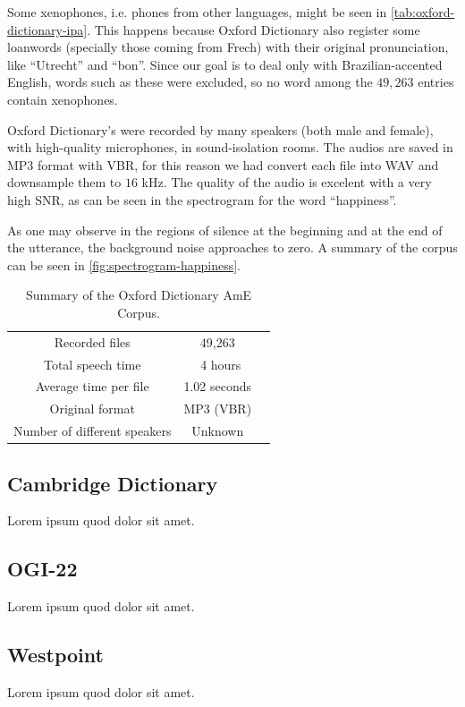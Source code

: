 Some xenophones, i.e. phones from other languages, might be seen in \autoref{tab:oxford-dictionary-ipa}. This happens because
Oxford Dictionary also register some loanwords (specially those coming from Frech) with their original pronunciation,
like ``Utrecht'' and ``bon''. Since our goal is to deal only with Brazilian-accented English, words such as these
were excluded, so no word among the $49,263$ entries contain xenophones.

Oxford Dictionary's were recorded by many speakers (both male and female), with high-quality microphones, in sound-isolation rooms.
The audios are saved in MP3 format with \ac{VBR}, for this reason we had convert each file into WAV and downsample them to $16$ kHz.
The quality of the audio is excelent with a very high \ac{SNR}, as can be seen in the spectrogram for the word ``happiness''.

As one may observe in the regions of silence at the beginning and at the end of the utterance, the background noise approaches to zero.
A summary of the corpus can be seen in \autoref{fig:spectrogram-happiness}.

\begin{table}[H]
\caption[Summary of the Oxford Dictionary AmE Corpus.]{Summary of the Oxford Dictionary AmE Corpus.}
\smallskip
\centering
\begin{tabular}{ccc} \toprule
  Recorded files & 49,263 \\
  Total speech time & ~4 hours \\
  Average time per file & 1.02 seconds \\
  Original format & MP3 (VBR) \\
  Number of different speakers & Unknown \\
  \bottomrule
\end{tabular}
\label{tab:oxford-summary}
\end{table}

\clearpage
\subsection{Cambridge Dictionary}
Lorem ipsum quod dolor sit amet.

\subsection{OGI-22}
Lorem ipsum quod dolor sit amet.

\subsection{Westpoint}
Lorem ipsum quod dolor sit amet.

